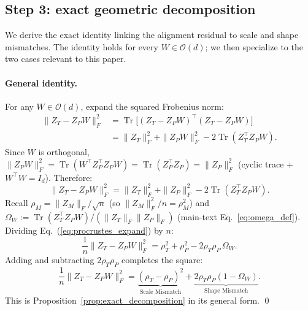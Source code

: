 


\subsection{Step 3: exact geometric decomposition}
\label{app:procrustes}

We derive the exact identity linking the alignment residual to scale and shape mismatches. The identity holds for every $W \in \mathcal{O}(d)$; we then specialize to the two cases relevant to this paper.

\paragraph{General identity.}
For any $W \in \mathcal{O}(d)$, expand the squared Frobenius norm:
\begin{equation}
\begin{aligned}
\|Z_T - Z_P W\|_F^2 &= \operatorname{Tr}\!\big[(Z_T - Z_P W)^\top (Z_T - Z_P W)\big] \\
&= \|Z_T\|_F^2 + \|Z_P W\|_F^2 - 2\operatorname{Tr}(Z_T^\top Z_P W).
\end{aligned}
\end{equation}
Since $W$ is orthogonal, $\|Z_P W\|_F^2 = \operatorname{Tr}(W^\top Z_P^\top Z_P W) = \operatorname{Tr}(Z_P^\top Z_P) = \|Z_P\|_F^2$ (cyclic trace + $W^\top W = I_d$). Therefore:
\begin{equation}
\label{eq:procrustes_expand}
\|Z_T - Z_P W\|_F^2 = \|Z_T\|_F^2 + \|Z_P\|_F^2 - 2\operatorname{Tr}(Z_T^\top Z_P W).
\end{equation}
Recall $\rho_M = \|Z_M\|_F/\sqrt{n}$ (so $\|Z_M\|_F^2/n = \rho_M^2$) and $\Omega_W := \operatorname{Tr}(Z_T^\top Z_P W)/(\|Z_T\|_F\|Z_P\|_F)$ (main-text Eq.~\ref{eq:omega_def}). Dividing Eq.~(\ref{eq:procrustes_expand}) by $n$:
\begin{equation}
\frac{1}{n}\|Z_T - Z_P W\|_F^2 = \rho_T^2 + \rho_P^2 - 2\rho_T\rho_P\, \Omega_W.
\end{equation}
Adding and subtracting $2\rho_T\rho_P$ completes the square:
\begin{equation}
\label{eq:exact_decomposition_general}
\frac{1}{n}\|Z_T - Z_P W\|_F^2 = \underbrace{(\rho_T - \rho_P)^2}_{\text{Scale Mismatch}} + \underbrace{2\rho_T\rho_P(1 - \Omega_W)}_{\text{Shape Mismatch}}.
\end{equation}
This is Proposition~\ref{prop:exact_decomposition} in its general form. \qed

